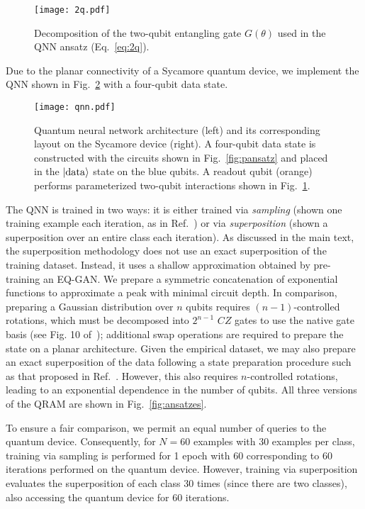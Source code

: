 \documentclass[prl,superscriptaddress,twocolumn]{revtex4}
\makeatletter
\newcommand{\sket}[1]{{\ensuremath{\lvert#1\rangle}}}
\newcommand{\lket}[1]{{\ensuremath{\left\lvert#1\right\rangle}}}
\newcommand{\ket}[1]{\if@display\lket{#1}\else\sket{#1}\fi}
\theoremstyle{plain}
\theoremstyle{definition}
\makeatother
\begin{document}
\begin{figure}[h!]
\begin{center}
\texttt{[image: 2q.pdf]}
\caption{Decomposition of the two-qubit entangling gate $G(\theta)$ used in the QNN ansatz (Eq.~\ref{eq:2q}).}
\label{fig:2q}
\end{center}
\end{figure}

Due to the planar connectivity of a Sycamore quantum device, we implement the QNN shown in Fig.~\ref{fig:qnn} with a four-qubit data state. 

\begin{figure}[h!]
\begin{center}
\texttt{[image: qnn.pdf]}
\caption{Quantum neural network architecture (left) and its corresponding layout on the Sycamore device (right). A four-qubit data state is constructed with the circuits shown in Fig.~\ref{fig:pansatz} and placed in the $\ket{\mathrm{data}}$ state on the blue qubits. A readout qubit (orange) performs parameterized two-qubit interactions shown in Fig.~\ref{fig:2q}.}
\label{fig:qnn}
\end{center}
\end{figure}

The QNN is trained in two ways: it is either trained via \emph{sampling} (shown one training example each iteration, as in Ref.~\cite{farhi2018classification}) or via \emph{superposition} (shown a superposition over an entire class each iteration). As discussed in the main text, the superposition methodology does not use an exact superposition of the training dataset. Instead, it uses a shallow approximation obtained by pre-training an EQ-GAN. We prepare a symmetric concatenation of exponential functions to approximate a peak with minimal circuit depth. In comparison, preparing a Gaussian distribution over $n$ qubits requires $(n-1)$-controlled rotations, which must be decomposed into $2^{n-1}$ $CZ$ gates to use the native gate basis (see Fig. 10 of~\cite{PhysRevA.102.012612}); additional swap operations are required to prepare the state on a planar architecture. Given the empirical dataset, we may also prepare an exact superposition of the data following a state preparation procedure such as that proposed in Ref.~\cite{aaronson2016complexity}. However, this also requires $n$-controlled rotations, leading to an exponential dependence in the number of qubits. All three versions of the QRAM are shown in Fig.~\ref{fig:ansatzes}.

To ensure a fair comparison, we permit an equal number of queries to the quantum device. Consequently, for $N=60$ examples with 30 examples per class, training via sampling is performed for 1 epoch with 60 corresponding to 60 iterations performed on the quantum device. However, training via superposition evaluates the superposition of each class 30 times (since there are two classes), also accessing the quantum device for 60 iterations.
\end{document}
